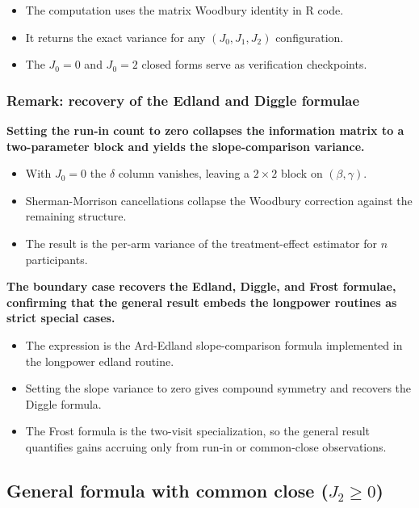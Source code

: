 \documentclass[
  11pt,
]{article}
\begin{document}
\begin{itemize}\setlength{\itemsep}{2pt}\setlength{\parskip}{0pt}
\item The computation uses the matrix Woodbury identity in R code.
\item It returns the exact variance for any $(J_0, J_1, J_2)$ configuration.
\item The $J_0=0$ and $J_0=2$ closed forms serve as verification checkpoints.
\end{itemize}

\subsubsection{Remark: recovery of the Edland and Diggle formulae}\label{remark-recovery-of-the-edland-and-diggle-formulae}

\textbf{Setting the run-in count to zero collapses the information matrix to a two-parameter block and yields the slope-comparison variance.}

\begin{itemize}\setlength{\itemsep}{2pt}\setlength{\parskip}{0pt}
\item With $J_0 = 0$ the $\delta$ column vanishes, leaving a $2 \times 2$ block on $(\beta, \gamma)$.
\item Sherman-Morrison cancellations collapse the Woodbury correction against the remaining structure.
\item The result is the per-arm variance of the treatment-effect estimator for $n$ participants.
\end{itemize}

\textbf{The boundary case recovers the Edland, Diggle, and Frost formulae, confirming that the general result embeds the longpower routines as strict special cases.}

\begin{itemize}\setlength{\itemsep}{2pt}\setlength{\parskip}{0pt}
\item The expression is the Ard-Edland slope-comparison formula implemented in the longpower edland routine.
\item Setting the slope variance to zero gives compound symmetry and recovers the Diggle formula.
\item The Frost formula is the two-visit specialization, so the general result quantifies gains accruing only from run-in or common-close observations.
\end{itemize}

\subsection{\texorpdfstring{General formula with common close (\(J_2 \ge 0\))}{General formula with common close (J\_2 \textbackslash ge 0)}}\label{general-formula-with-common-close-j_2-ge-0}
\end{document}
